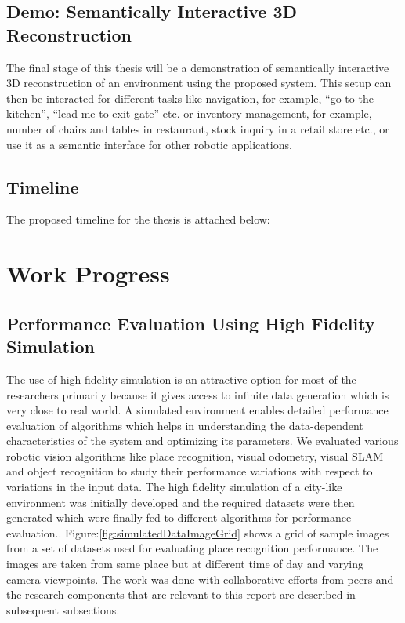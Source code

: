 \documentclass{article}
\begin{document}
\subsection{Demo: Semantically Interactive 3D Reconstruction}
The final stage of this thesis will be a demonstration of semantically interactive 3D reconstruction of an environment using the proposed system. This setup can then be interacted for different tasks like navigation, for example, ``go to the kitchen'', ``lead me to exit gate'' etc. or inventory management, for example, number of chairs and tables in restaurant, stock inquiry in a retail store etc., or use it as a semantic interface for other robotic applications.

\subsection{Timeline}
The proposed timeline for the thesis is attached below:

\begin{figure}[!htbp]
\centering
 \label{fig:Timeline}
\end{figure}


\section{Work Progress}

\subsection{Performance Evaluation Using High Fidelity Simulation}
The use of high fidelity simulation is an attractive option for most of the researchers primarily because it gives access to infinite data generation which is very close to real world. A simulated environment enables detailed performance evaluation of algorithms which helps in understanding the data-dependent characteristics of the system and optimizing its parameters. We evaluated various robotic vision algorithms like place recognition, visual odometry, visual SLAM and object recognition to study their performance variations with respect to variations in the input data. The high fidelity simulation of a city-like environment was initially developed and the required datasets were then generated which were finally fed to different algorithms for performance evaluation.. Figure:\ref{fig:simulatedDataImageGrid} shows a grid of sample images from a set of datasets used for evaluating place recognition performance. The images are taken from same place but at different time of day and varying camera viewpoints. The work was done with collaborative efforts from peers and the research components that are relevant to this report are described in subsequent subsections.
\end{document}
